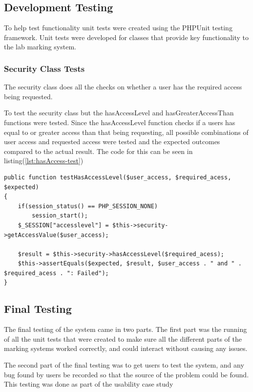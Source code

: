 \documentclass[12pt]{article}  %
\begin{document}
\subsection{Development Testing}
To help test functionality unit tests were created using the PHPUnit testing framework. Unit tests were developed for classes that provide key functionality to the lab marking system. 

\subsubsection{Security Class Tests}

The security class does all the checks on whether a user has the required access being requested. 

To test the security class but the hasAccessLevel and hasGreaterAccessThan functions were tested. Since the hasAccessLevel function checks if a users has equal to or greater access than that being requesting, all possible combinations of user access and requested access were tested and the expected outcomes compared to the actual result. The code for this can be seen in listing(\ref{lst:hasAccess-test})

\singlespacing
\begin{lstlisting}[basicstyle=\linespread{0.8}, caption= hasAccessLevel Test, label = lst:hasAccess-test]
public function testHasAccessLevel($user_access, $required_acess, $expected)
{
    if(session_status() == PHP_SESSION_NONE)
        session_start();
    $_SESSION["accesslevel"] = $this->security->getAccessValue($user_access);

    $result = $this->security->hasAccessLevel($required_acess);
    $this->assertEquals($expected, $result, $user_access . " and " . $required_acess . ": Failed");
}
\end{lstlisting}
\doublespacing



\subsection{Final Testing}

The final testing of the system came in two parts. The first part was the running of all the unit tests that were created to make sure all the different parts of the marking systems worked correctly, and could interact without causing any issues.

The second part of the final testing was to get users to test the system, and any bug found by users be recorded so that the source of the problem could be found. This testing was done as part of the usability case study 
\end{document}
